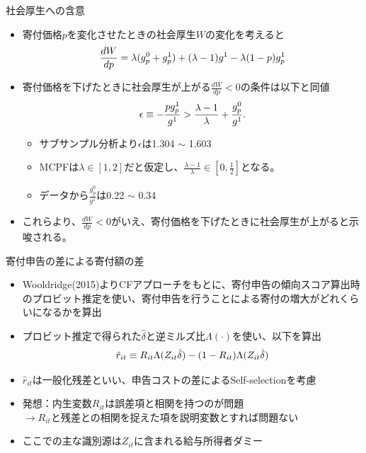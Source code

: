 \documentclass[dvipdfmx,10pt]{beamer}
\begin{document}
\begin{frame}{社会厚生への含意}
	\begin{itemize}
		\item 寄付価格$p$を変化させたときの社会厚生$W$の変化を考えると
		\begin{align}
			\frac{dW}{dp} =\lambda (g_p^0+g_p^1)+(\lambda-1)g^1-\lambda(1-p)g_p^1\notag
		\end{align}
		\item 寄付価格を下げたときに社会厚生が上がる$\frac{dW}{dp}<0$の条件は以下と同値
		\begin{align}
			\epsilon\equiv -\frac{pg_p^1}{g^1}>\frac{\lambda-1}{\lambda}+\frac{g_p^0}{g^1}\notag.
		\end{align}
		\begin{itemize}
		\item サブサンプル分析より$\epsilon$は1.304 $\sim$ 1.603
		\item MCPFは$\lambda\in[1,2]$だと仮定し、$\frac{\lambda-1}{\lambda}\in[0,\frac12]$となる。
		\item データから$\frac{g_p^0}{g^1}$は0.22 $\sim$ 0.34
		\end{itemize}
		\item これらより、$\frac{dW}{dp}<0$がいえ、寄付価格を下げたときに社会厚生が上がると示唆される。
	\end{itemize}
\end{frame}



\begin{frame}{寄付申告の差による寄付額の差}
	\begin{itemize}
		\item Wooldridge(2015)よりCFアプローチをもとに、寄付申告の傾向スコア算出時のプロビット推定を使い、寄付申告を行うことによる寄付の増大がどれくらいになるかを算出
		\item プロビット推定で得られた$\hat{\delta}$と逆ミルズ比$\Lambda(\cdot)$を使い、以下を算出
		\begin{align}
			\hat{r}_{it}\equiv R_{it}\Lambda(Z_{it}\hat{\delta})-(1-R_{it})\Lambda(Z_{it}\hat{\delta})\notag
		\end{align}
		\item $\hat{r}_{it}$は一般化残差といい、申告コストの差によるSelf-selectionを考慮
		\item 発想：内生変数$R_{it}$は誤差項と相関を持つのが問題\\
		\qquad$\to$$R_{it}$と残差との相関を捉えた項を説明変数とすれば問題ない
		\item ここでの主な識別源は$Z_{it}$に含まれる給与所得者ダミー
	\end{itemize}
\end{frame}
\end{document}
